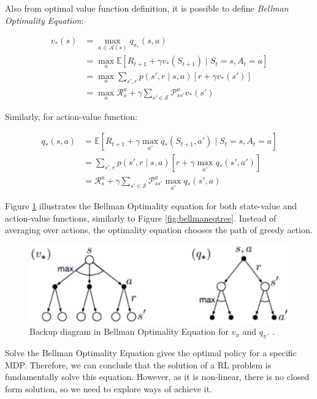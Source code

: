 Also from optimal value function definition, it is possible to define \textit{Bellman Optimality Equation}:

\begin{align}
v_{*}(s) &= \max_{a \in \mathcal{A}(s)} q_{\pi_{*}}(s,a)\\
&= \max_{a} \mathbb{E}[R_{t+1} + \gamma v_{*}(S_{t+1}) \mid S_{t} = s, A_{t} = a]\\
&= \max_{a} \sum_{s', r} p(s', r \mid s, a)[r + \gamma v_{*}(s')]\\
&= \max_{a}\mathcal{R}_{s}^{a} + \gamma \sum_{s' \in \mathcal{S}} \mathcal{P}_{ss'}^{a} v_{*}(s')
\end{align}

Similarly, for action-value function:

\begin{align}
q_{*}(s,a) &= \mathbb{E}[R_{t+1} + \gamma \max_{a'} q_{*} (S_{t+1}, a') \mid S_{t} = s, A_{t} = a] \\
&= \sum_{s',r}p(s',r \mid s,a)[r + \gamma \max_{a'}q_{*}(s',a')] \\
&= \mathcal{R}_{s}^{a} + \gamma \sum_{s' \in \mathcal{S}} \mathcal{P}_{ss'}^{a} \max_{a'} q_{*}(s',a)
\end{align}

Figure \ref{fig:bellmanoptimality} illustrates the Bellman Optimality equation for both state-value and action-value functions, similarly to Figure \ref{fig:bellmaneqtree}. Instead of averaging over actions, the optimality equation chooses the path of greedy action.


\begin{figure}[!htpb]
	\centering
	\includegraphics[scale=0.5]{Cap4/bellmanoptimality.eps}
	\caption{Backup diagram in Bellman Optimality Equation for $v_{\pi}$ and $q_{\pi}$. \cite{sutton1998rli}.}
	\label{fig:bellmanoptimality}
\end{figure}

Solve the Bellman Optimality Equation gives the optimal policy for a specific MDP. Therefore, we can conclude that the solution of a RL problem is fundamentally solve this equation. However, as it is non-linear, there is no closed form solution, so we need to explore ways of achieve it.

